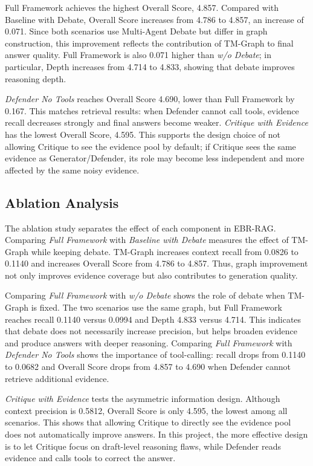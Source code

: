 \documentclass[12pt,a4paper]{article}
\begin{document}
Full Framework achieves the highest Overall Score, 4.857. Compared with Baseline with Debate, Overall Score increases from 4.786 to 4.857, an increase of 0.071. Since both scenarios use Multi-Agent Debate but differ in graph construction, this improvement reflects the contribution of TM-Graph to final answer quality. Full Framework is also 0.071 higher than \textit{w/o Debate}; in particular, Depth increases from 4.714 to 4.833, showing that debate improves reasoning depth.

\textit{Defender No Tools} reaches Overall Score 4.690, lower than Full Framework by 0.167. This matches retrieval results: when Defender cannot call tools, evidence recall decreases strongly and final answers become weaker. \textit{Critique with Evidence} has the lowest Overall Score, 4.595. This supports the design choice of not allowing Critique to see the evidence pool by default; if Critique sees the same evidence as Generator/Defender, its role may become less independent and more affected by the same noisy evidence.

\subsection{Ablation Analysis}

The ablation study separates the effect of each component in EBR-RAG. Comparing \textit{Full Framework} with \textit{Baseline with Debate} measures the effect of TM-Graph while keeping debate. TM-Graph increases context recall from 0.0826 to 0.1140 and increases Overall Score from 4.786 to 4.857. Thus, graph improvement not only improves evidence coverage but also contributes to generation quality.

Comparing \textit{Full Framework} with \textit{w/o Debate} shows the role of debate when TM-Graph is fixed. The two scenarios use the same graph, but Full Framework reaches recall 0.1140 versus 0.0994 and Depth 4.833 versus 4.714. This indicates that debate does not necessarily increase precision, but helps broaden evidence and produce answers with deeper reasoning. Comparing \textit{Full Framework} with \textit{Defender No Tools} shows the importance of tool-calling: recall drops from 0.1140 to 0.0682 and Overall Score drops from 4.857 to 4.690 when Defender cannot retrieve additional evidence.

\textit{Critique with Evidence} tests the asymmetric information design. Although context precision is 0.5812, Overall Score is only 4.595, the lowest among all scenarios. This shows that allowing Critique to directly see the evidence pool does not automatically improve answers. In this project, the more effective design is to let Critique focus on draft-level reasoning flaws, while Defender reads evidence and calls tools to correct the answer.
\end{document}
